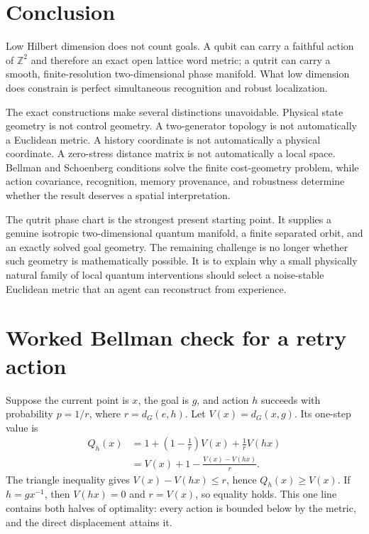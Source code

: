\documentclass[11pt]{article}
\theoremstyle{definition}
\theoremstyle{remark}
\newcommand{\Z}{\mathbb Z}
\begin{document}
\section{Conclusion}

Low Hilbert dimension does not count goals. A qubit can carry a faithful
action of $\Z^2$ and therefore an exact open lattice word metric; a qutrit can
carry a smooth, finite-resolution two-dimensional phase manifold. What low
dimension does constrain is perfect simultaneous recognition and robust
localization.

The exact constructions make several distinctions unavoidable. Physical state
geometry is not control geometry. A two-generator topology is not
automatically a Euclidean metric. A history coordinate is not automatically a
physical coordinate. A zero-stress distance matrix is not automatically a
local space. Bellman and Schoenberg conditions solve the finite cost-geometry
problem, while action covariance, recognition, memory provenance, and
robustness determine whether the result deserves a spatial interpretation.

The qutrit phase chart is the strongest present starting point. It supplies a
genuine isotropic two-dimensional quantum manifold, a finite separated orbit,
and an exactly solved goal geometry. The remaining challenge is no longer
whether such geometry is mathematically possible. It is to explain why a small
physically natural family of local quantum interventions should select a
noise-stable Euclidean metric that an agent can reconstruct from experience.

\appendix

\section{Worked Bellman check for a retry action}
\label{app:bellman}

Suppose the current point is $x$, the goal is $g$, and action $h$ succeeds
with probability $p=1/r$, where $r=d_G(e,h)$. Let
$V(x)=d_G(x,g)$. Its one-step value is
\begin{align}
 Q_h(x)
 &=1+\left(1-\frac1r\right)V(x)+\frac1rV(hx)\nonumber\\
 &=V(x)+1-\frac{V(x)-V(hx)}r.
 \label{eq:worked-bellman}
\end{align}
The triangle inequality gives $V(x)-V(hx)\le r$, hence
$Q_h(x)\ge V(x)$. If $h=gx^{-1}$, then $V(hx)=0$ and $r=V(x)$, so equality
holds. This one line contains both halves of optimality: every action is
bounded below by the metric, and the direct displacement attains it.
\end{document}
